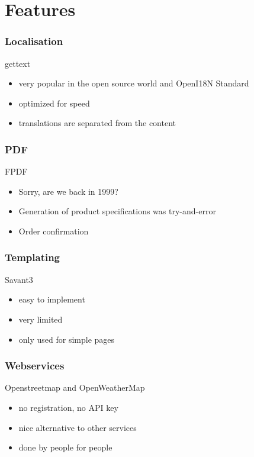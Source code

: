 \section{Features}
%
\begin{frame}
\frametitle{Localisation}
%
\begin{center}
{\Large gettext}
\end{center}
\vspace{1cm}
%
\begin{itemize}
  \item very popular in the open source world and OpenI18N Standard
  \item optimized for speed
  \item translations are separated from the content
\end{itemize}
\end{frame}
%
\begin{frame}
\frametitle{PDF}
%
\begin{center}
{\Large FPDF}
\end{center}
\vspace{1cm}
%
\begin{itemize}
  \item Sorry, are we back in 1999?
  \item Generation of product specifications was try-and-error
  \item Order confirmation 
  \end{itemize}
\end{frame}
%
\begin{frame}
\frametitle{Templating}
%
\begin{center}
{\Large Savant3}
\end{center}
\vspace{1cm}
\begin{itemize}
  \item easy to implement
  \item very limited
  \item only used for simple pages
  \end{itemize}
\end{frame}
%
\begin{frame}
\frametitle{Webservices}
%
\begin{center}
{\Large Openstreetmap and OpenWeatherMap}
\end{center}
\vspace{1cm}
%
\begin{itemize}
  \item no registration, no API key
  \item nice alternative to other services
  \item done by people for people
  \end{itemize}
\end{frame}
